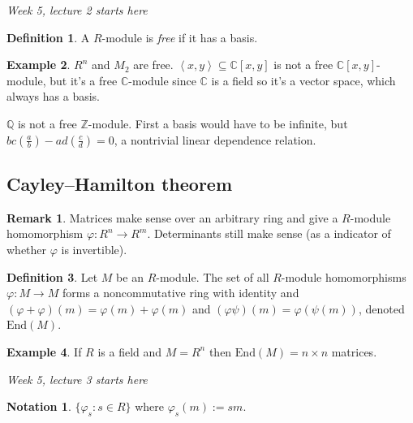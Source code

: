 \documentclass[a4paper]{article}
\newcommand{\la}{\left\langle}
\newcommand{\ra}{\right\rangle}
\newcommand{\Z}{\mathbb Z}
\newcommand{\Q}{\mathbb Q}
\newcommand{\C}{\mathbb C}
\newcommand{\End}{\text{End}}
\theoremstyle{definition}
\newtheorem{defn}{Definition}[subsection]
\newtheorem{example}[defn]{Example}
\newtheorem*{remark}{Remark}
\newtheorem*{notation}{Notation}
\begin{document}
\begin{flushright}
\textit{Week 5, lecture 2 starts here}
\end{flushright}

\begin{defn}
A $R$-module is \textit{free} if it has a basis.
\end{defn}
\begin{example}
$R^n$ and $M_2$ are free. $\la x,y\ra \subseteq \C[x,y]$ is not a free $\C[x,y]$-module, but it's a free $\C$-module since $\C$ is a field so it's a vector space, which always has a basis.

$\Q$ is not a free $\Z$-module. First a basis would have to be infinite, but $bc\left(\frac{a}{b}\right)-ad\left(\frac{c}{d}\right)=0$, a nontrivial linear dependence relation.
\end{example}

\subsection{Cayley–Hamilton theorem}
\begin{remark}
Matrices make sense over an arbitrary ring and give a $R$-module homomorphism $\varphi:R^n\rightarrow R^m$. Determinants still make sense (as a indicator of whether $\varphi$ is invertible).
\end{remark}

\begin{defn}
Let $M$ be an $R$-module. The set of all $R$-module homomorphisms $\varphi:M\rightarrow M$ forms a noncommutative ring with identity and $(\varphi+\varphi)(m)=\varphi(m)+\varphi(m)$ and $(\varphi\psi)(m)=\varphi(\psi(m))$, denoted $\End(M)$.
\end{defn}
\begin{example}
If $R$ is a field and $M=R^n$ then $\End(M)=n\times n$ matrices.
\end{example}

\begin{flushright}
\textit{Week 5, lecture 3 starts here}
\end{flushright}

\begin{notation}
$\{\varphi_s:s\in R\}$ where $\varphi_s(m):=sm$.
\end{notation}
\end{document}
